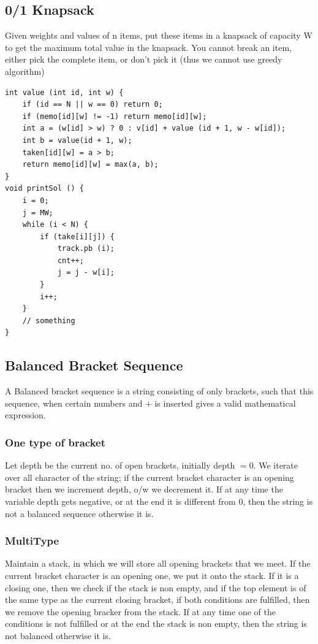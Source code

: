 \documentclass[8pt, a4paper, oneside, twocolumn]{extarticle}
\begin{document}
\subsection{0/1 Knapsack}
Given weights and values of n items, put these items in a knapsack of capacity W to get the maximum total value in the knapsack. You cannot break an item, either pick the complete item, or don’t pick it (thus we cannot use greedy algorithm)
\begin{verbatim}
int value (int id, int w) {
    if (id == N || w == 0) return 0;
    if (memo[id][w] != -1) return memo[id][w];
    int a = (w[id] > w) ? 0 : v[id] + value (id + 1, w - w[id]);
    int b = value(id + 1, w);
    taken[id][w] = a > b;
    return memo[id][w] = max(a, b);
}
void printSol () {
    i = 0;
    j = MW;
    while (i < N) {
        if (take[i][j]) {
            track.pb (i);
            cnt++;
            j = j - w[i];
        }
        i++;
    }
    // something
}
\end{verbatim}
\subsection{Balanced Bracket Sequence}
A Balanced bracket sequence is a string consisting of only brackets, such that this sequence, when certain numbers and $+$ is inserted gives a valid mathematical expression.
\subsubsection{One type of bracket}
Let depth be the current no. of open brackets, initially depth $= 0$. We iterate over all character of the string; if the current bracket character is an opening bracket then we increment depth, o/w we decrement it. If at any time the variable depth gets negative, or at the end it is different from 0, then the string is not a balanced sequence otherwise it is.
\subsubsection{MultiType}
Maintain a stack, in which we will store all opening brackets that we meet. If the current bracket character is an opening one, we put it onto the stack. If it is a closing one, then we check if the stack is non empty, and if the top element is of the same type as the current closing bracket, if both conditions are fulfilled, then we remove the opening bracker from the stack. If at any time one of the conditions is not fulfilled or at the end the stack is non empty, then the string is not balanced otherwise it is.
\end{document}
